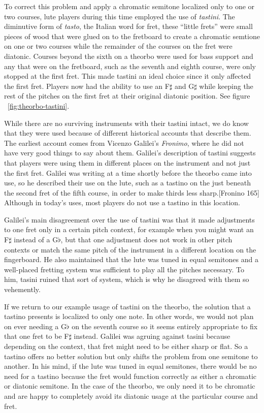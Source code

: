To correct this problem and apply a chromatic semitone localized only to one or two
courses, lute players during this time employed the use of \textit{tastini}.  The
diminutive form of \textit{tasto}, the Italian word for fret, these ``little frets'' were
small pieces of wood that were glued on to the fretboard to create a chromatic semtione on
one or two courses while the remainder of the courses on the fret were diatonic.  Courses
beyond the sixth on a theorbo were used for bass support and any that were on the
fretboard, such as the seventh and eighth course, were only stopped at the first fret.
This made tastini an ideal choice since it only affected the first fret. Players now had
the ability to use an F$\sharp$ and G$\sharp$ while keeping the rest of the pitches on the
first fret at their original diatonic position. See figure ~\ref{fig:theorbo-tastini}.

While there are no surviving instruments with their tastini intact, we do know that they
were used because of different historical accounts that describe them.  The earliest
account comes from Vicenzo Galilei's \textit{Fronimo}, where he did not have very good
things to say about them.  Galilei's description of tastini suggests that players were
using them in different places on the instrument and not just the first fret.  Galilei was
writing at a time shortly before the theorbo came into use, so he described their use on
the lute, such as a tastino on the just beneath the second fret of the fifth course, in
order to make thirds less sharp.[Fronino 165]  Although in today's uses, most players do
not use a tastino in this location.

Galilei's main disagreement over the use of tastini was that it made adjustments to one
fret only in a certain pitch context, for example when you might want an F$\sharp$ instead
of a G$\flat$, but that one adjustment does not work in other pitch contexts or match the
same pitch of the instrument in a different location on the fingerboard.  He also
maintained that the lute was tuned in equal semitones and a well-placed fretting system
was sufficient to play all the pitches necessary. To him, tasini ruined that sort of
system, which is why he disagreed with them so vehemently.

If we return to our example usage of tastini on the theorbo, the solution that a tastino
presents is localized to only one note.  In other words, we would not plan on ever needing
a G$\flat$ on the seventh course so it seems entirely appropriate to fix that one fret to
be F$\sharp$ instead.  Galilei was agruing against tasini because depending on the
context, that fret might need to be either sharp or flat.  So a tastino offers no better
solution but only shifts the problem from one semitone to another.  In his mind, if the
lute was tuned in equal semitones, there would be no need for a tastino because the fret
would function correctly as either a chromatic or diatonic semitone.  In the case of the
theorbo, we only need it to be chromatic and are happy to completely avoid its diatonic
usage at the particular course and fret.

